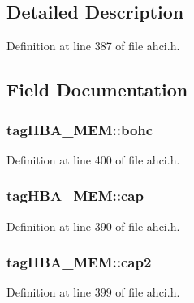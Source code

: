 \subsection{Detailed Description}


Definition at line 387 of file ahci.\+h.



\subsection{Field Documentation}
\subsubsection[{\texorpdfstring{bohc}{bohc}}]{ tag\+H\+B\+A\+\_\+\+M\+E\+M\+::bohc}\hypertarget{structtagHBA__MEM_a1efc56b8a33d024424d582d4f5d20c76}{}\label{structtagHBA__MEM_a1efc56b8a33d024424d582d4f5d20c76}


Definition at line 400 of file ahci.\+h.

\subsubsection[{\texorpdfstring{cap}{cap}}]{ tag\+H\+B\+A\+\_\+\+M\+E\+M\+::cap}\hypertarget{structtagHBA__MEM_ade2b27aa0751affb0a2a3ae4524dad1d}{}\label{structtagHBA__MEM_ade2b27aa0751affb0a2a3ae4524dad1d}


Definition at line 390 of file ahci.\+h.

\subsubsection[{\texorpdfstring{cap2}{cap2}}]{ tag\+H\+B\+A\+\_\+\+M\+E\+M\+::cap2}\hypertarget{structtagHBA__MEM_a54e8a62903ba72eb3a6cf3bae97da878}{}\label{structtagHBA__MEM_a54e8a62903ba72eb3a6cf3bae97da878}


Definition at line 399 of file ahci.\+h.

